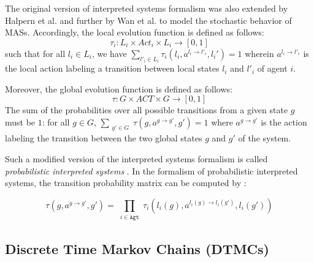 The original version of interpreted systems formalism was also extended by Halpern et al. \cite{Halpern2003} and further by Wan et al. \cite{Wan2013} to model the stochastic behavior of MASs. Accordingly, the local evolution function is defined as follows:
%
\begin{equation}
\tau_i: L_i \times Act_i \times L_i \rightarrow[0,1]
\end{equation}
%
such that for all $l_i \in L_i$, we have $\sum_{l'_i\in L_i}
\tau_i(l_i,a^{l_i\rightarrow l'_i},l_i')=1$ wherein
$a^{l_i\rightarrow l'_i}$ is the local action labeling a
transition between local states $l_i$ and $l'_i$ of agent $i$.


Moreover, the global evolution function is defined as follows:
%
\begin{equation}
\tau: G \times ACT \times G \rightarrow[0,1]
\end{equation}
%
The sum of the probabilities over all possible transitions from a given state $g$ must be $1$: for all $g \in G$, $\sum_{\substack{g'\in G}}
\tau(g,a^{g\rightarrow g'},g')=1$ where $a^{g\rightarrow g'}$ is
the action labeling the transition between the two global states
$g$ and $g'$ of the system.

Such a modified version of the interpreted systems formalism is
called \textit{probabilistic interpreted systems}
\cite{Halpern2003}. In the formalism of probabilistic interpreted
systems, the transition probability matrix can be computed by
\cite{Wan2013}:

\begin{equation}\label{global-evo-fun}
\tau(g,a^{g\rightarrow g'},g')= {\prod_{\substack{i \in
\texttt{Agt}}} \tau_i(l_i(g), a^{l_i(g) \rightarrow
l_i(g')},l_i(g'))}
\end{equation}




\subsection{Discrete Time Markov Chains (DTMCs)} \label{sec:DTMC-cha2}

